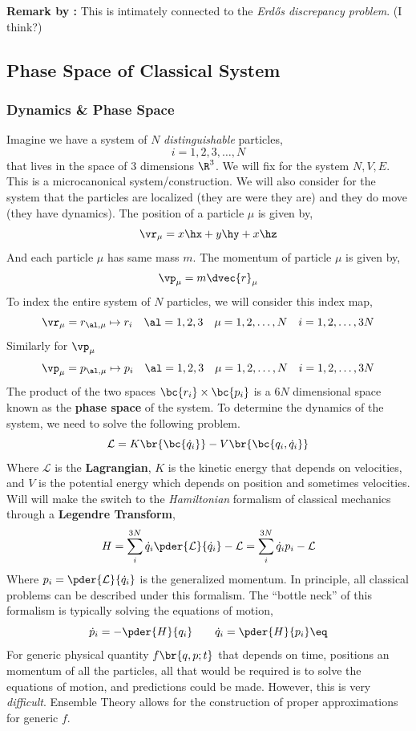 \documentclass{article}
\begin{document}
\textbf{Remark by \AuthorName:} This is intimately connected to the \textit{Erdős discrepancy problem}. (I think?)

\subsection{Phase Space of Classical System}
\subsubsection{Dynamics \& Phase Space}

Imagine we have a system of $N$ \textit{distinguishable} particles,
\[ i = 1,2,3,\ldots,N \]
that lives in the space of 3 dimensions $\R^3$. We will fix for the system $N,V,E$. This is a microcanonical system/construction. We will also consider for the system that the particles are localized (they are were they are) and they do move (they have dynamics). The position of a particle $\mu$ is given by,
\[ \vr_\mu = x \hx + y \hy + x \hz \]
And each particle $\mu$ has same mass $m$. The momentum of particle $\mu$ is given by,
\[ \vp_\mu = m \dvec{r}_\mu \]
To index the entire system of $N$ particles, we will consider this index map,
\[ \vr_\mu = r_{\al,\mu} \mapsto r_i \quad \al = 1,2,3 \quad  \mu = 1,2,\ldots, N \quad  i = 1,2,\ldots,3N \]
Similarly for $\vp_\mu$
\[ \vp_\mu = p_{\al,\mu} \mapsto p_i \quad \al = 1,2,3 \quad  \mu = 1,2,\ldots, N \quad  i = 1,2,\ldots,3N \]
The product of the two spaces $\bc{r_i} \times \bc{p_i}$ is a $6N$ dimensional space known as the \textbf{phase space} of the system. To determine the dynamics of the system, we need to solve the following problem.
\[ \mathcal{L} = K\br{\bc{\dot{q}_i}} - V\br{\bc{q_i, \dot{q}_i}} \]
Where $\mathcal{L}$ is the \textbf{Lagrangian}, $K$ is the kinetic energy that depends on velocities, and $V$ is the potential energy which depends on position and sometimes velocities. Will will make the switch to the \textit{Hamiltonian} formalism of classical mechanics through a \textbf{Legendre Transform},
\[ H = \sum_{i}^{3N} \dot{q}_i \pder{\mathcal{L}}{\dot{q}_i} - \mathcal{L} = \sum_{i}^{3N} \dot{q}_i p_i - \mathcal{L} \]
Where $p_i = \pder{\mathcal{L}}{\dot{q}_i}$ is the generalized momentum. In principle, all classical problems can be described under this formalism. The ``bottle neck'' of this formalism is typically solving the equations of motion,
\[ \dot{p}_i = - \pder{H}{q_i} \qquad \dot{q}_i = \pder{H}{p_i} \eq \label{eq:hamiltonmechanics} \]
For generic physical quantity $f\br{q,p;t}$ that depends on time, positions an momentum of all the particles, all that would be required is to solve the equations of motion, and predictions could be made. However, this is very \textit{difficult}. Ensemble Theory allows for the construction of proper approximations for generic $f$. \\
\end{document}
